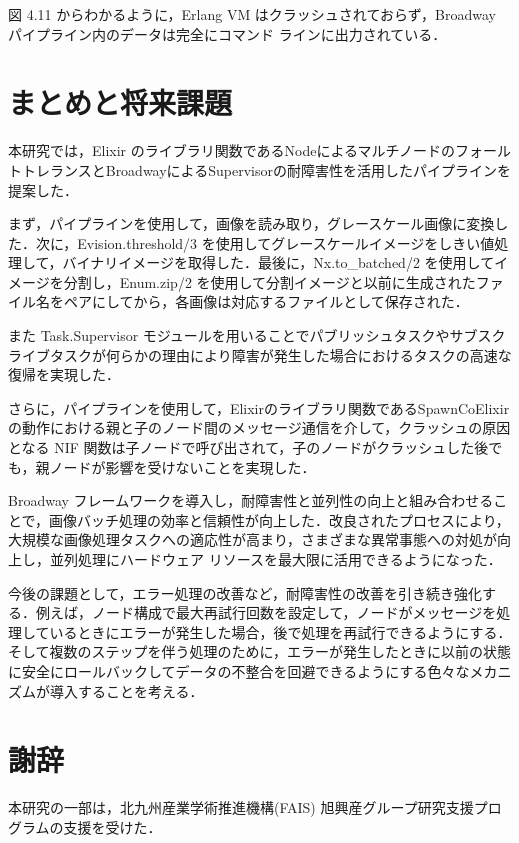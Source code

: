 \documentclass[a4paper]{jreport}	%
\begin{document}
図 4.11 からわかるように，Erlang VM はクラッシュされておらず，Broadway パイプライン内のデータは完全にコマンド ラインに出力されている．
\chapter{まとめと将来課題}
本研究では，Elixir のライブラリ関数であるNodeによるマルチノードのフォールトトレランスとBroadwayによるSupervisorの耐障害性を活用したパイプラインを提案した．

まず，パイプラインを使用して，画像を読み取り，グレースケール画像に変換した．次に，Evision.threshold/3 を使用してグレースケールイメージをしきい値処理して，バイナリイメージを取得した．最後に，Nx.to\_batched/2 を使用してイメージを分割し，Enum.zip/2 を使用して分割イメージと以前に生成されたファイル名をペアにしてから，各画像は対応するファイルとして保存された．

また Task.Supervisor モジュールを用いることでパブリッシュタスクやサブスクライブタスクが何らかの理由により障害が発生した場合におけるタスクの高速な復帰を実現した． 

さらに，パイプラインを使用して，Elixirのライブラリ関数であるSpawnCoElixirの動作における親と子のノード間のメッセージ通信を介して，クラッシュの原因となる NIF 関数は子ノードで呼び出されて，子のノードがクラッシュした後でも，親ノードが影響を受けないことを実現した．

Broadway フレームワークを導入し，耐障害性と並列性の向上と組み合わせることで，画像バッチ処理の効率と信頼性が向上した．改良されたプロセスにより，大規模な画像処理タスクへの適応性が高まり，さまざまな異常事態への対処が向上し，並列処理にハードウェア リソースを最大限に活用できるようになった．

今後の課題として，エラー処理の改善など，耐障害性の改善を引き続き強化する．例えば，ノード構成で最大再試行回数を設定して，ノードがメッセージを処理しているときにエラーが発生した場合，後で処理を再試行できるようにする．そして複数のステップを伴う処理のために，エラーが発生したときに以前の状態に安全にロールバックしてデータの不整合を回避できるようにする色々なメカニズムが導入することを考える．
\chapter*{謝辞}
本研究の一部は，北九州産業学術推進機構(FAIS) 旭興産グループ研究支援プログラムの支援を受けた．



\newpage
{}
\renewcommand{\bibname}{参考文献}
\end{document}
